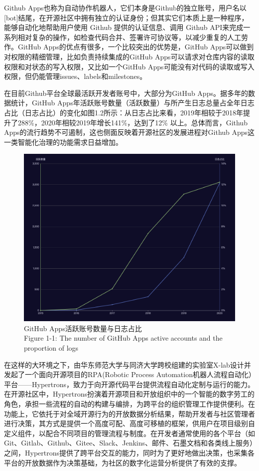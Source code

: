 \par Github Apps也称为自动协作机器人，它们本身是Github的独立账号，用户名以[bot]结尾，在开源社区中拥有独立的认证身份；但其实它们本质上是一种程序，能够自动化地帮助用户使用 Github 提供的认证信息、调用 Github API来完成一系列相对复杂的操作，如检查代码合并、签署许可协议等，以减少重复的人工劳作。GitHub Apps的优点有很多，一个比较突出的优势是，GitHub Apps可以做到对权限的精细管理，比如负责持续集成的GitHub Apps可以请求对仓库内容的读取权限和对状态的写入权限，又比如一个GitHub Apps可能没有对代码的读取或写入权限，但仍能管理issues、labels和milestones。

\par 在目前Github平台全球最活跃开发者账号中，大部分为GitHub Apps。据多年的数据统计，GitHub Apps年活跃账号数量（活跃数量）与所产生日志总量占全年日志占比（日志占比）的变化如图1.2所示：从日志占比来看，2019年相较于2018年提升了288\%，2020年相较2019年增长141\%，达到了12\% 以上。总体而言，Github Apps的流行趋势不可遏制，这也侧面反映着开源社区的发展进程对Github Apps这一类智能化治理的功能需求日益增加。
\begin{figure}[H]
    \centering
    \includegraphics[width=130mm]{./figures/image1-2.png}
    \caption{GitHub Apps活跃账号数量与日志占比\\Figure 1-1: The number of GitHub Apps active accounts and the proportion of logs}
\end{figure}

\par 在这样的大环境之下，由华东师范大学与同济大学跨校组建的实验室X-lab设计并发起了一个面向开源项目的RPA(Robotic Process Automation机器人流程自动化）平台——Hypertrons，致力于向开源代码平台提供流程自动化定制与运行的能力。在开源社区中，Hypertrons扮演着开源项目和开放组织中的一个智能的数字劳工的角色，承担一些流程的自动的构建与编排，为跨平台的组织管理工作提供便利。在功能上，它依托于对全域开源行为的开放数据分析结果，帮助开发者与社区管理者进行决策，其方式是提供一个高度可配、高度可移植的框架，供用户在项目级别自定义组件，以配合不同项目的管理流程与制度。在开发者通常使用的各个平台（如Git、Gitlab、Github、Gitee、Slack、Jenkins、邮件、石墨文档和各类线上服务）之间，Hypertrons提供了跨平台交互的能力，同时为了更好地做出决策，也采集各平台的开放数据作为决策基础，为社区的数字化运营分析提供了有效的支撑。


